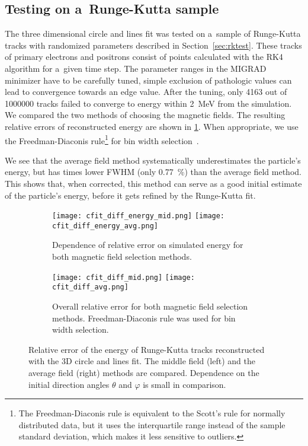 			\subsection{Testing on a~Runge-Kutta sample}
				The three dimensional circle and lines fit was tested on a~sample of Runge-Kutta tracks with randomized parameters described in Section~\ref{sec:rktest}. These tracks of primary electrons and positrons consist of points calculated with the \ac{RK4} algorithm for a~given time step. The parameter ranges in the MIGRAD minimizer have to be carefully tuned, simple exclusion of pathologic values can lead to convergence towards an edge value. After the tuning, only \num{4163} out of \num{1000000} tracks failed to converge to energy within \qty{2}{\MeV} from the simulation. We compared the two methods of choosing the magnetic fields. The resulting relative errors of reconstructed energy are shown in \cref{fig:cfit_rk}. When appropriate, we use the Freedman-Diaconis rule\footnote{The Freedman-Diaconis rule is equivalent to the Scott's rule for normally distributed data, but it uses the interquartile range instead of the sample standard deviation, which makes it less sensitive to outliers.} for bin width selection~\cite{FreedmanDiac}.

				We see that the average field method systematically underestimates the particle's energy, but has  times lower \acs{FWHM} (only \qty{0.77}{\percent}) than the average field method. This shows that, when corrected, this method can serve as a good initial estimate of the particle's energy, before it gets refined by the Runge-Kutta fit.
				
				\begin{figure}
					\centering
					\begin{subfigure}[t]{\textwidth}
						\centering
						\texttt{[image: cfit\_diff\_energy\_mid.png]}
						\hfill
						\texttt{[image: cfit\_diff\_energy\_avg.png]}
						\caption{Dependence of relative error on simulated energy for both magnetic field selection methods.}
					\end{subfigure}
					\begin{subfigure}[t]{\textwidth}
						\centering
						\texttt{[image: cfit\_diff\_mid.png]}
						\hfill
						\texttt{[image: cfit\_diff\_avg.png]}
						\caption{Overall relative error for both magnetic field selection methods. Freedman-Diaconis rule was used for bin width selection.}
					\end{subfigure}
					\caption{Relative error of the energy of Runge-Kutta tracks reconstructed with the 3D circle and lines fit. The middle field (left) and the average field (right) methods are compared. Dependence on the initial direction angles $\theta$ and $\varphi$ is small in comparison.}
					\label{fig:cfit_rk}
				\end{figure}
	
